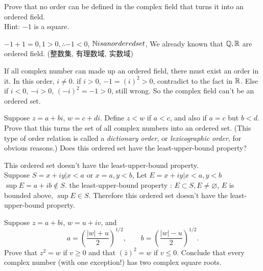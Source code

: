 \begin{myexercise}
    \label{ex:1.8}
    Prove that no order can be defined in the complex field that turns it into an ordered field. \\
    Hint: $-1$ is a square.
\end{myexercise}


\mySolve
$-1+1=0, 1>0, \therefore -1<0$, ${\protect\mathbb N} is an ordered set$, We already known that ${\protect\mathbb Q}, {\protect\mathbb R}$ are ordered field. (整数集, 有理数域, 实数域)

If all complex number can made up an ordered field, there must exist an order in it. In this order, $i \neq 0$. if $i > 0$, $-1 = (i)^2 > 0$, contradict to the fact in ${\protect\mathbb R}$. Else if $i < 0$, $-i > 0$, $(-i)^2 = -1 > 0$, still wrong. So the complex field can't be an ordered set.


\begin{myexercise}
    \label{ex:1.9}
    Suppose $z=a+ bi$, $w=c+di$. Define $z<w$ if $a<c$, and also if $a=c$ but
    $b < d$. Prove that this turns the set of all complex numbers into an ordered set.
    (This type of order relation is called a \emph{dictionary order}, or \emph{lexicographic order}, for
    obvious reasons.) Does this ordered set have the least-upper-bound property?
\end{myexercise}

\mySolve

This ordered set doesn't have the least-upper-bound property.\\
Suppose $S = {x+iy| x<a \text{ or } x=a, y<b}$,
Let $E = {x+iy|x<a,y<b}$ $\sup E = a+ib \not\in S$.
the least-upper-bound property : $E \subset S, E \neq \varnothing$, $E$ is bounded above, $\sup E \in S$.
Therefore this ordered set doesn't have the least-upper-bound property.

\begin{myexercise}    
    \label{ex:1.10}
    Suppose $z = a + bi$, $w =u + iv$, and
    \begin{equation*}
        a = \left(\frac{|w|+u}{2}\right)^{1/2},\qquad
        b = \left(\frac{|w|-u}{2}\right)^{1/2}.
    \end{equation*}
    Prove that $z^2 = w$ if $v \geq 0$ and that $(\bar{z})^2 = w$ if $v \leq 0$. Conclude that every complex
    number (with one exception!) has two complex square roots.
\end{myexercise}

